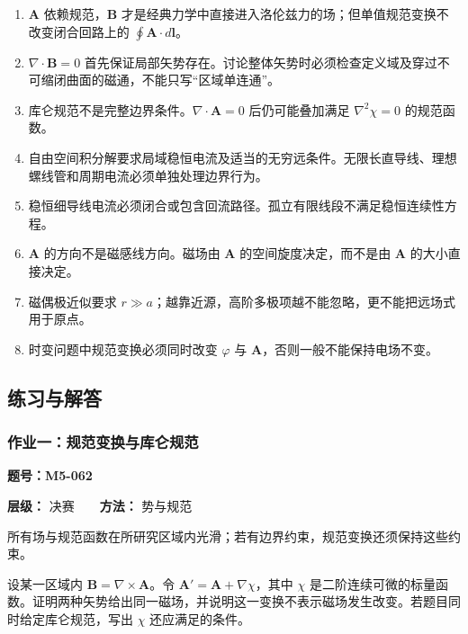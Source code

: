 \begin{enumerate}
\def\labelenumi{\arabic{enumi}.}
\tightlist
\item
  \(\mathbf A\) 依赖规范，\(\mathbf B\)
  才是经典力学中直接进入洛伦兹力的场；但单值规范变换不改变闭合回路上的
  \(\oint\mathbf A\cdot d\mathbf l\)。
\item
  \(\nabla\cdot\mathbf B=0\)
  首先保证局部矢势存在。讨论整体矢势时必须检查定义域及穿过不可缩闭曲面的磁通，不能只写``区域单连通''。
\item
  库仑规范不是完整边界条件。\(\nabla\cdot\mathbf A=0\) 后仍可能叠加满足
  \(\nabla^2\chi=0\) 的规范函数。
\item
  自由空间积分解要求局域稳恒电流及适当的无穷远条件。无限长直导线、理想螺线管和周期电流必须单独处理边界行为。
\item
  稳恒细导线电流必须闭合或包含回流路径。孤立有限线段不满足稳恒连续性方程。
\item
  \(\mathbf A\) 的方向不是磁感线方向。磁场由 \(\mathbf A\)
  的空间旋度决定，而不是由 \(\mathbf A\) 的大小直接决定。
\item
  磁偶极近似要求
  \(r\gg a\)；越靠近源，高阶多极项越不能忽略，更不能把远场式用于原点。
\item
  时变问题中规范变换必须同时改变 \(\varphi\) 与
  \(\mathbf A\)，否则一般不能保持电场不变。
\end{enumerate}

\subsection{练习与解答}\label{m5:ux7ec3ux4e60ux4e0eux89e3ux7b54-3}

\par{}
\noindent\begin{minipage}{\linewidth}

\subsubsection{作业一：规范变换与库仑规范}\label{m5:ux4f5cux4e1aux4e00ux89c4ux8303ux53d8ux6362ux4e0eux5e93ux4ed1ux89c4ux8303}

\textbf{题号：M5-062}

\textbf{层级：} 决赛　　\textbf{方法：} 势与规范

所有场与规范函数在所研究区域内光滑；若有边界约束，规范变换还须保持这些约束。

设某一区域内 \(\mathbf B=\nabla\times\mathbf A\)。令
\(\mathbf A'=\mathbf A+\nabla\chi\)，其中 \(\chi\)
是二阶连续可微的标量函数。证明两种矢势给出同一磁场，并说明这一变换不表示磁场发生改变。若题目同时给定库仑规范，写出
\(\chi\) 还应满足的条件。

\end{minipage}\par


